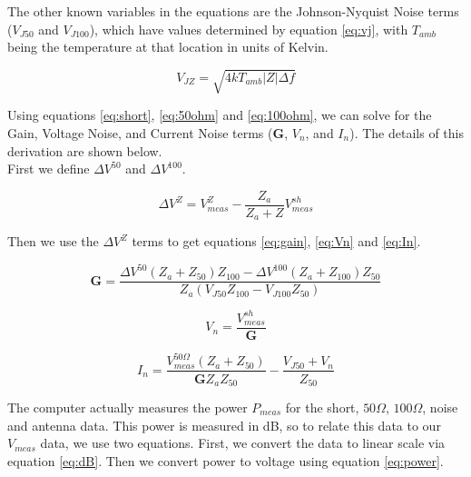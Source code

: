 \documentclass[9pt]{article}
\begin{document}
The other known variables in the equations are the Johnson-Nyquist Noise terms ($V_{J50}$ and $V_{J100}$), which have values determined by equation \ref{eq:vj}, with $T_{amb}$ being the temperature at that location in units of Kelvin. 

\begin{center}
\begin{equation} \label{eq:vj}
V_{JZ} = \sqrt{4kT_{amb}|Z| \Delta f}
\end{equation}
\end{center}

Using equations \ref{eq:short}, \ref{eq:50ohm} and \ref{eq:100ohm}, we can solve for the Gain, Voltage Noise, and Current Noise terms ($\mathbf{G}$, $V_n$, and $I_n$). The details of this derivation are shown below. \\

First we define $\Delta V^{50}$ and $\Delta V^{100}$. 

\begin{center}
\begin{equation} \label{eq:dV}
\Delta V^Z = V^{Z}_{meas} - \frac{Z_a}{Z_a+Z}V^{sh}_{meas}
\end{equation}
\end{center}

Then we use the $\Delta V^Z$ terms to get equations \ref{eq:gain}, \ref{eq:Vn} and \ref{eq:In}.

\begin{center}
\begin{equation} \label{eq:gain}
\mathbf{G} = \frac{\Delta V^{50} (Z_a+Z_{50})Z_{100} - \Delta V^{100} (Z_a+Z_{100}) Z_{50}}{Z_a (V_{J50} Z_{100}-V_{J100} Z_{50})}
\end{equation}

\begin{equation} \label{eq:Vn}
V_n = \frac{V^{sh}_{meas}}{\mathbf{G}}
\end{equation}

\begin{equation} \label{eq:In}
I_n = \frac{V^{50 \Omega}_{meas} (Z_a+Z_{50})}{\mathbf{G} Z_a Z_{50}}-\frac{V_{J50}+V_n}{Z_{50}}
\end{equation}
\end{center}

The computer actually measures the power $P_{meas}$ for the short, $50 \Omega$, $100 \Omega$, noise and antenna data. This power is measured in dB, so to relate this data to our $V_{meas}$ data, we use two equations. First, we convert the data to linear scale via equation \ref{eq:dB}. Then we convert power to voltage using equation \ref{eq:power}. 
\end{document}
